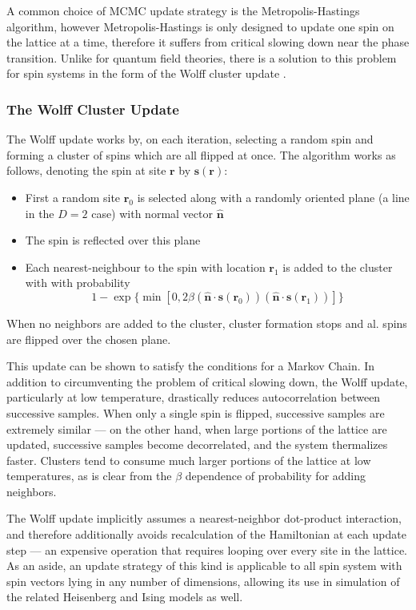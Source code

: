 \documentclass[12pt]{article}
\begin{document}
A common choice of MCMC update strategy is the Metropolis-Hastings algorithm, however Metropolis-Hastings is only designed to update one spin on the lattice at a time, therefore
it suffers from critical slowing down near the phase transition. Unlike for quantum field theories, there is a solution to this problem for spin systems in the form
of the Wolff cluster update \cite{PhysRevLett.62.361}.

\subsubsection{The Wolff Cluster Update}

The Wolff update works by, on each iteration, selecting a random spin and forming a cluster of spins which are all flipped at once. The algorithm works as follows,
denoting the spin at site $\mathbf{r}$ by $\mathbf{s}(\mathbf{r})$:

\begin{itemize}
	\item First a random site $\mathbf{r}_0$ is selected along with a randomly oriented plane (a line in the $D=2$ case) with normal vector $\mathbf{\hat{n}}$
	\item The spin is reflected over this plane
	\item Each nearest-neighbour to the spin with location $\mathbf{r}_1$ is added to the cluster with with probability \[
		      1-\exp\{\min[0,2\beta(\mathbf{\hat{n}} \cdot \mathbf{s}(\mathbf{r}_0))(\mathbf{\hat{n}} \cdot \mathbf{s}(\mathbf{r}_1))]\}
	      \]
\end{itemize}

When no neighbors are added to the cluster, cluster formation stops and al. spins are flipped over the chosen plane.

This update can be shown to satisfy the conditions for a Markov Chain. In addition to circumventing the problem of critical slowing down, the Wolff update, particularly
at low temperature, drastically reduces autocorrelation between successive samples. When only a single spin is flipped, successive samples are extremely similar --- on the other hand, when large portions of the lattice are updated, successive samples become decorrelated, and the
system thermalizes faster. Clusters tend to consume much larger portions of the lattice at low temperatures, as is clear from the $\beta$ dependence of probability for 
adding neighbors.

The Wolff update implicitly assumes a nearest-neighbor dot-product interaction, and therefore additionally avoids recalculation of the Hamiltonian at each update step ---
an expensive operation that requires looping over every site in the lattice. As an aside, an update strategy of this kind is applicable to all spin system with spin vectors
lying in any number of dimensions, allowing its use in simulation of the related Heisenberg and Ising models as well.
\end{document}
